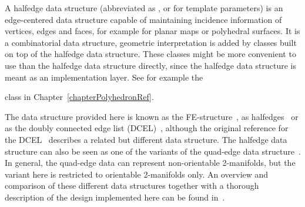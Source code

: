


A halfedge data structure (abbreviated as , or
 for template parameters) is an edge-centered data structure
capable of maintaining incidence information of vertices, edges and
faces, for example for planar maps or polyhedral surfaces. It is a
combinatorial data structure, geometric interpretation is added by
classes built on top of the halfedge data structure.  These classes
might be more convenient to use than the halfedge data structure
directly, since the halfedge data structure is meant as an
implementation layer.  See for example the \begin{center}
                                                                    
                                                                   \end{center}
class in Chapter~\ref{chapterPolyhedronRef}.

The data structure provided here is known as the
FE-structure~\cite{w-ebdss-85}, as
halfedges~\cite{m-ism-88,cgal:bfh-mgedm-95} or as the doubly connected edge
list (DCEL)~\cite{bkos-cgaa-97}, although the original reference for
the DCEL~\cite{mp-fitcp-78} describes a related but different data
structure. The halfedge data structure can also be seen as one of the
variants of the quad-edge data structure~\cite{gs-pmgsc-85}. In
general, the quad-edge data can represent non-orientable 2-manifolds,
but the variant here is restricted to orientable 2-manifolds only. An
overview and comparison of these different data structures together
with a thorough description of the design implemented here can be
found in~\cite{k-ugpdd-99}.


